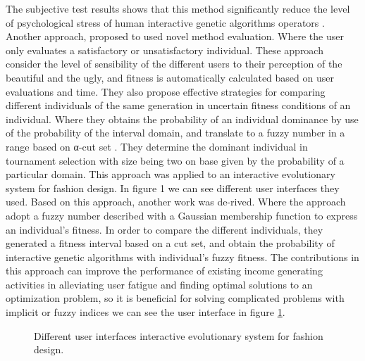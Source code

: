 The subjective test results shows that this method significantly reduce the
level of psychological stress of human interactive genetic algorithms operators
\cite{ohsaki1998input}. Another approach, proposed to used novel method
evaluation. Where the user only evaluates a satisfactory or unsatisfactory
individual. These approach consider the level of sensibility of the different
users to their perception of the beautiful and the ugly, and fitness is
automatically calculated based on user evaluations and time. They also propose
effective strategies for comparing different individuals of the same generation
in uncertain fitness conditions of an individual. Where they obtains the
probability of an individual dominance by use of the probability of the interval
domain, and translate to a fuzzy number in a range based on α-cut set
\cite{gong2009impact}. They determine the dominant individual in tournament
selection with size being two on base given by the probability of a particular
domain. This approach was applied to an interactive evolutionary system for
fashion design. In figure 1 we can see different user interfaces they used.
Based on this approach, another work was de-rived. Where the approach adopt a
fuzzy number described with a Gaussian membership function to express an
individual's fitness. In order to compare the different individuals, they
generated a fitness interval based on a cut set, and obtain the probability of
interactive genetic algorithms with individual's fuzzy fitness. The
contributions in this approach can improve the performance of existing income
generating activities in alleviating user fatigue and finding optimal solutions
to an optimization problem, so it is beneficial for solving complicated problems
with implicit or fuzzy indices \cite{gong2011interactive} we can see the user
interface in figure \ref{fig:fashion}.

\begin{figure}
\captionsetup{justification=centering,margin=2cm}
\centering
\setlength\fboxsep{0pt}
\setlength\fboxrule{0.7pt}
\caption{Different user interfaces interactive evolutionary system for fashion design.}
\label{fig:fashion}
\end{figure}

